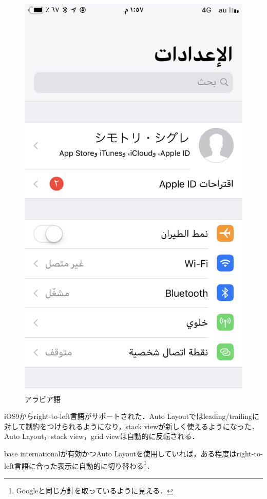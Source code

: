 \begin{figure}[htbp]
\begin{minipage}{0.5\hsize}
\begin{center}
            \includegraphics[width=\linewidth]{images/ios_preferences_rtl.png}
        \end{center}
        \caption{アラビア語}
    \end{minipage}
\end{figure}

iOS9からright-to-left言語がサポートされた．Auto Layoutではleading/trailingに対して制約をつけられるようになり，stack viewが新しく使えるようになった\cite{developer.apple.com:videos/play/wwdc2016/232/}\cite{developer.apple.com:library/archive/releasenotes/General/RN-iOSSDK-9.0/index.html}．Auto Layout，stack view，grid viewは自動的に反転される．

base internationalが有効かつAuto Layoutを使用していれば，ある程度はright-to-left言語に合った表示に自動的に切り替わる\footnote{Googleと同じ方針\cite{material.io/design/usability/bidirectionality.html}を取っているように見える．}\cite{developer.apple.com:library/archive/documentation/MacOSX/Conceptual/BPInternational/SupportingRight-To-LeftLanguages/SupportingRight-To-LeftLanguages.html}．

